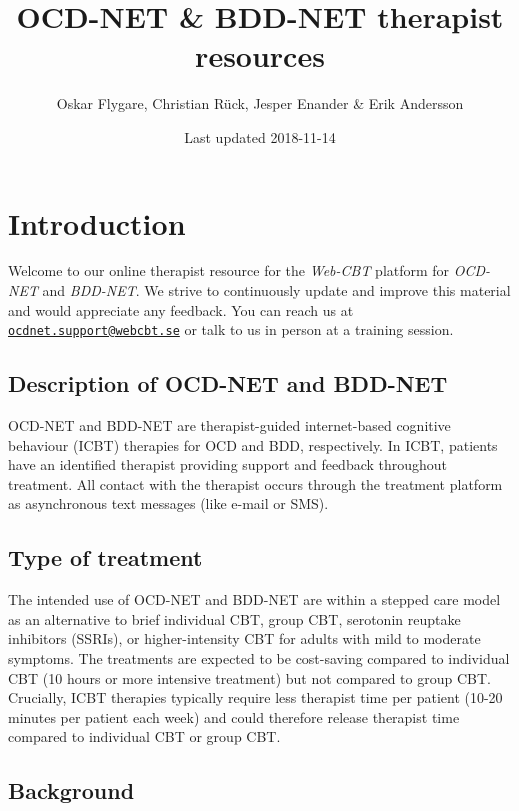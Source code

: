 \documentclass[]{book}
\title{OCD-NET \& BDD-NET therapist resources}
\author{Oskar Flygare, Christian Rück, Jesper Enander \& Erik Andersson}
\date{Last updated 2018-11-14}
\theoremstyle{definition}
\theoremstyle{definition}
\theoremstyle{definition}
\theoremstyle{remark}
\begin{document}
\maketitle

{
\setcounter{tocdepth}{1}
\tableofcontents
}
\hypertarget{introduction}{%
\chapter{Introduction}\label{introduction}}

Welcome to our online therapist resource for the \emph{Web-CBT} platform
for \emph{OCD-NET} and \emph{BDD-NET}. We strive to continuously update
and improve this material and would appreciate any feedback. You can
reach us at
\href{mailto:ocdnet.support@webcbt.se}{\nolinkurl{ocdnet.support@webcbt.se}}
or talk to us in person at a training session.

\hypertarget{description-of-ocd-net-and-bdd-net}{%
\section{Description of OCD-NET and
BDD-NET}\label{description-of-ocd-net-and-bdd-net}}

OCD-NET and BDD-NET are therapist-guided internet-based cognitive
behaviour (ICBT) therapies for OCD and BDD, respectively. In ICBT,
patients have an identified therapist providing support and feedback
throughout treatment. All contact with the therapist occurs through the
treatment platform as asynchronous text messages (like e-mail or SMS).

\hypertarget{type-of-treatment}{%
\section{Type of treatment}\label{type-of-treatment}}

The intended use of OCD-NET and BDD-NET are within a stepped care model
as an alternative to brief individual CBT, group CBT, serotonin reuptake
inhibitors (SSRIs), or higher-intensity CBT for adults with mild to
moderate symptoms. The treatments are expected to be cost-saving
compared to individual CBT (10 hours or more intensive treatment) but
not compared to group CBT. Crucially, ICBT therapies typically require
less therapist time per patient (10-20 minutes per patient each week)
and could therefore release therapist time compared to individual CBT or
group CBT.

\hypertarget{background}{%
\section{Background}\label{background}}
\end{document}
